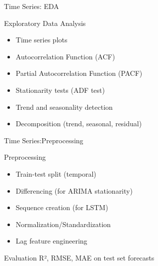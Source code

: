 \documentclass[aspectratio=169,10pt]{beamer}
\begin{document}
\begin{frame}{Time Series: EDA}
\begin{block}{Exploratory Data Analysis}
\begin{itemize}
    \item Time series plots
    \item Autocorrelation Function (ACF)
    \item Partial Autocorrelation Function (PACF)
    \item Stationarity tests (ADF test)
    \item Trend and seasonality detection
    \item Decomposition (trend, seasonal, residual)
\end{itemize}
\end{block}

\vspace{0.3cm}



\end{frame}
\begin{frame}{Time Series:Preprocessing}
\begin{block}{Preprocessing}
\begin{itemize}
    \item Train-test split (temporal)
    \item Differencing (for ARIMA stationarity)
    \item Sequence creation (for LSTM)
    \item Normalization/Standardization
    \item Lag feature engineering
\end{itemize}
\end{block}

\vspace{0.3cm}

\begin{alertblock}{Evaluation}
R², RMSE, MAE on test set forecasts
\end{alertblock}
\end{frame}
\end{document}
